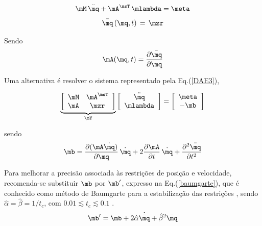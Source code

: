 \documentclass[]{politex}
\begin{document}
\begin{equation}
\mM \, \ddot{\mq} + \mA^\msT \,\mlambda = \meta
\label{DAE1}
\end{equation}
%
\begin{equation}
\bar{\mq} \, (\mq,t) \, = \, \mzr
\label{DAE2}
\end{equation}

Sendo
\begin{equation}
\mA(\mq,t) = \frac{\partial \bar{\mq}}{\partial \mq}
\end{equation}

Uma alternativa é resolver o sistema representado pela Eq.(\ref{DAE3}), 

\begin{equation}
\underbrace{\left[ \begin{array}{cc}
\mM & \mA^\msT \\
\mA & \mzr
\end{array}
\right]}_{\mY}
\left[ \begin{array}{c}
\ddot{\mq} \\
\mlambda
\end{array}
\right] =
\left[ \begin{array}{c}
\meta \\
-\mb
\end{array}
\right]
\label{DAE3}
\end{equation}

\vspace{0.5cm}

sendo
\begin{equation}
\mb = \frac{\partial (\mA \dot{\mq})}{\partial \mq} \, \dot{\mq} + 2 \frac{\partial \mA}{\partial t} \, \dot{\mq} + \frac{\partial^2 \bar{\mq}}{\partial t^2}
\end{equation}

Para melhorar a precisão associada às restrições de posição e velocidade, recomenda-se substituir $\mb$ por $\mb'$, expresso na Eq.(\ref{baumgarte}), que é conhecido como método de Baumgarte para a estabilização das restrições \cite{Baumgarte, Featherstone, Nikravesh}, sendo $\hat{\alpha} = \hat{\beta} = 1/t_c$, com  $0.01 \lesssim t_c \lesssim 0.1 $ \cite{Featherstone}. 
%
\begin{equation}
\mb' = \mb + 2\hat{\alpha} \dot{\bar{\mq}} + \hat{\beta}^2 \bar{\mq}
\label{baumgarte}
\end{equation}
\end{document}

